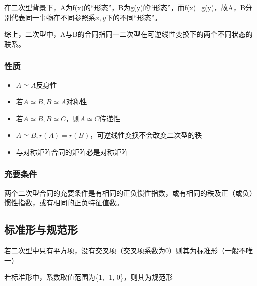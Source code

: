 在二次型背景下，A为f(x)的“形态”，B为g(y)的“形态”，而f(x)=g(y)，故A，B分别代表同一事物在不同参照系\(x, y\)下的不同“形态”。

综上，二次型中，A与B的合同指同一二次型在可逆线性变换下的两个不同状态的联系。


\subsubsection{性质}
\begin{itemize}
    \item \(A \simeq A\)反身性
    \item 若\(A \simeq B, B \simeq A\)对称性
    \item 若\(A \simeq B, B \simeq C\)，则\(A \simeq C\)传递性
    \item \(A \simeq B, r(A) = r(B)\)，可逆线性变换不会改变二次型的秩
    \item 与对称矩阵合同的矩阵必是对称矩阵
\end{itemize}


\subsubsection{充要条件}
两个二次型合同的充要条件是有相同的正负惯性指数，或有相同的秩及正（或负）惯性指数，或有相同的正负特征值数。


\subsection{标准形与规范形}

若二次型中只有平方项，没有交叉项（交叉项系数为0）则其为标准形（一般不唯一）

若标准形中，系数取值范围为\{1, -1, 0\}，则其为规范形


